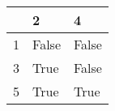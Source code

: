 \begin{tabular}{lll}
\toprule
{} &      2 &      4 \\
\midrule
1 &  False &  False \\
3 &   True &  False \\
5 &   True &   True \\
\bottomrule
\end{tabular}
